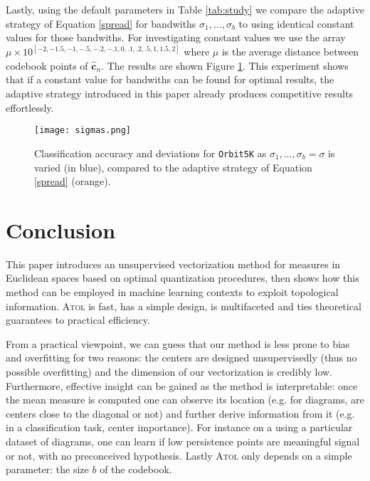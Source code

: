 \documentclass[twoside]{article}
\newcommand{\cb}{\mathbf{c}}
\begin{document}
Lastly, using the default parameters in Table \ref{tab:study} we compare the adaptive strategy of Equation \eqref{spread} for bandwiths $\sigma_1, \dots, \sigma_b$ to using identical constant values for those bandwiths. For investigating constant values we use the array $\mu \times 10^{[-2, -1.5, -1, -.5, -.2, -.1, 0, .1, .2, .5, 1, 1.5, 2]}$ where $\mu$ is the average distance between codebook points of $\hat{\cb}_n$. The results are shown Figure \ref{fig:sigmas}. This experiment shows that if a constant value for bandwiths can be found for optimal results, the adaptive strategy introduced in this paper already produces competitive results effortlessly.

\begin{figure}
	\centering
	\texttt{[image: sigmas.png]}
	\caption{Classification accuracy and deviations for \texttt{Orbit5K} as $\sigma_1, \dots, \sigma_b = \sigma$ is varied (in blue), compared to the adaptive strategy of Equation \eqref{spread} (orange).}
	\label{fig:sigmas}
\end{figure}


\section{Conclusion}

This paper introduces an unsupervised vectorization method for measures in Euclidean spaces based on optimal quantization procedures, then shows how this method can be employed in machine learning contexts to exploit topological information. \textsc{Atol} is fast, has a simple design, is multifaceted and ties theoretical guarantees to practical efficiency.

From a practical viewpoint, we can guess that our method is less prone to bias and overfitting for two reasons: the centers are designed unsupervisedly (thus no possible overfitting) and the dimension of our vectorization is credibly low. Furthermore, effective insight can be gained as the method is interpretable: once the mean measure is computed one can observe its location (e.g. for diagrams, are centers close to the diagonal or not) and further derive information from it (e.g. in a classification task, center importance). For instance on a using a particular dataset of diagrams, one can learn if low persistence points are meaningful signal or not, with no preconceived hypothesis. Lastly \textsc{Atol} only depends on a simple parameter: the size $b$ of the codebook.







\end{document}
